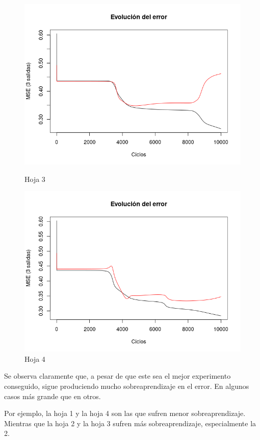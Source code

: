 \documentclass{uc3mpracticas}
\begin{document}
\begin{figure}[!h]
\centering
\begin{minipage}{.52\textwidth}
  \centering
  \includegraphics[width=.9\linewidth]{Images/best_fold3.png}
  \caption*{Hoja 3}
\end{minipage}%
\begin{minipage}{.52\textwidth}
  \centering
  \includegraphics[width=.9\linewidth]{Images/best_fold4.png}
  \caption*{Hoja 4}
\end{minipage}
\end{figure}


Se observa claramente que, a pesar de que este sea el mejor experimento conseguido, sigue produciendo mucho sobreaprendizaje en el error. En algunos casos más grande que en otros.

\vspace{2mm}

Por ejemplo, la hoja 1 y la hoja 4 son las que sufren menor sobreaprendizaje. Mientras que la hoja 2 y la hoja 3 sufren más sobreaprendizaje, especialmente la 2.
\end{document}
